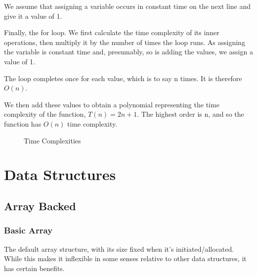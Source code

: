 \documentclass[]{article}
\begin{document}
We assume that assigning a variable occurs in constant time on the next line and give it a value of 1.

Finally, the for loop. We first calculate the time complexity of its inner operations, then multiply it by the number of times the loop runs. As assigning the variable is constant time and, presumably, so is adding the values, we assign a value of 1.

The loop completes once for each value, which is to say n times. It is therefore $O(n)$.

We then add these values to obtain a polynomial representing the time complexity of the function, $T(n) = 2n + 1$. The highest order is n, and so the function has $O(n)$ time complexity.

\begin{figure}
\centering
{}
\caption{Time Complexities}
\label{fig:time}
\end{figure}

\pagebreak

\section{Data Structures}

\subsection{Array Backed}

\subsubsection{Basic Array}

The default array structure, with its size fixed when it's initiated/allocated. While this makes it inflexible in some senses relative to other data structures, it has certain benefits.
\end{document}
